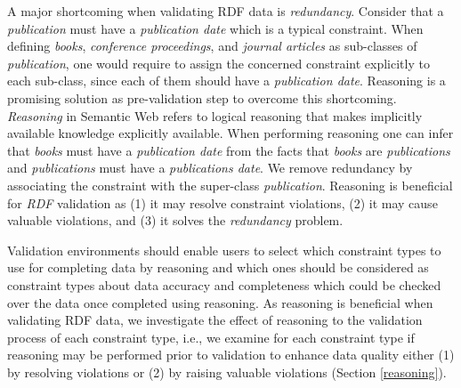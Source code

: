 \documentclass{acm_proc_article-sp}
\begin{document}
A major shortcoming when validating RDF data is \emph{redundancy}.
Consider that a \emph{publication} must have a \emph{publication date} which is a typical constraint.
When defining \emph{books}, \emph{conference proceedings}, and \emph{journal articles} as sub-classes of \emph{publication}, 
one would require to assign the concerned constraint explicitly to each sub-class, 
since each of them should have a \emph{publication date}.
Reasoning is a promising solution as pre-validation step to overcome this shortcoming. 
\emph{Reasoning} in Semantic Web refers to logical reasoning that  makes implicitly available knowledge explicitly available.
When performing reasoning one can infer that \emph{books} must have a \emph{publication date} 
from the facts that \emph{books} are \emph{publications} and \emph{publications} must have a \emph{publications date}.  
We remove redundancy by associating the constraint with the super-class \emph{publication}.
Reasoning is beneficial for \emph{RDF} validation as 
(1) it may resolve constraint violations, 
(2) it may cause valuable violations, and 
(3) it solves the \emph{redundancy} problem. 

Validation environments should enable users to select which constraint types to use for completing data by reasoning 
and which ones should be considered as constraint types about data accuracy and completeness which could be checked over the data once completed using reasoning.
As reasoning is beneficial when validating RDF data, 
we investigate the effect of reasoning to the validation process of each constraint type, i.e.,
we examine for each constraint type if reasoning may be performed prior to validation to enhance data quality
either (1) by resolving violations or (2) by raising valuable violations (Section \ref{reasoning}).
\end{document}
